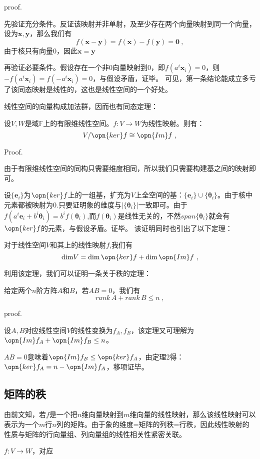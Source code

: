 proof.

先验证充分条件。反证该映射并非单射，及至少存在两个向量映射到同一个向量，设为$\boldsymbol{x,y}$，那么我们有
\begin{equation}
f(\boldsymbol{x}-\boldsymbol{y})=f(\boldsymbol x)-f(\boldsymbol y)=\boldsymbol 0~,
\end{equation}
由于核只有向量$0$，因此$\boldsymbol {x}=\boldsymbol{y}$

再验证必要条件。假设存在一个非$0$向量映射到$0$，即$f(a^i\boldsymbol x_i)=0$，则$-f(a^i\boldsymbol x_i)=f(-a^i\boldsymbol x_i)=0$，与假设矛盾，证毕。
可见，第一条结论能成立多亏了该同态映射是线性的，这也是线性空间的一个好处。

线性空间的向量构成加法群，因而也有同态定理：
\begin{theorem}{}
设$V,W$是域$\mathbb F$上的有限维线性空间。$f:V\rightarrow W$为线性映射。则有：
\begin{equation}
V/\opn{ker}f\cong \opn{Im} f~,
\end{equation}
\end{theorem}
Proof.

由于有限维线性空间的同构只需要维度相同，所以我们只需要构建基之间的映射即可。

设$\{\boldsymbol e_i\}$为$\opn{ker}f$上的一组基，扩充为$V$上全空间的基：$\{\boldsymbol e_i\}\cup \{\boldsymbol \theta_i\}$。由于核中元素都被映射为0.只要证明象的维度与$|\{\boldsymbol \theta_i\}|$一致即可。由于$f(a^i\boldsymbol e_i+b^i\boldsymbol \theta_i)=b^if(\boldsymbol \theta_i)$,而$f(\boldsymbol \theta_i)$是线性无关的，不然$span\{\boldsymbol \theta_i\}$就会有$\opn{ker}f$的元素，与假设矛盾。证毕。
该证明同时也引出了以下定理：
\begin{lemma}{}
对于线性空间$V$和其上的线性映射$f$,我们有
\begin{equation}
\mathrm{dim}V=\mathrm{dim}\,\opn{ker}f+\mathrm {dim}\,\opn{Im}f~,
\end{equation}
\end{lemma}
利用该定理，我们可以证明一条关于秩的定理：
\begin{theorem}{}
给定两个$n$阶方阵$A$和$B$，若$AB=0$，我们有
\begin{equation}
rank\,A+rank\,B\le n~,
\end{equation}
\end{theorem}
proof.

设$A,B$对应线性空间$V$的线性变换为$f_A,f_B$，该定理又可理解为$\opn{Im}f_A+\opn{Im}f_B\le n$。

$AB=0$意味着$\opn{Im}f_B\le \opn{ker}f_A$，由定理2得：$\opn{ker}f_A=n-\opn{Im}f_A$，移项证毕。
\subsection{矩阵的秩}
由前文知，若$f$是一个把$n$维向量映射到$m$维向量的线性映射，那么该线性映射可以表示为一个$m$行$n$列的矩阵。由于象的维度=矩阵的列秩=行秩，因此线性映射的性质与矩阵的行向量组、列向量组的线性相关性紧密关联。
\begin{theorem}{}
$f:V\rightarrow W$，对应$$
\end{theorem}